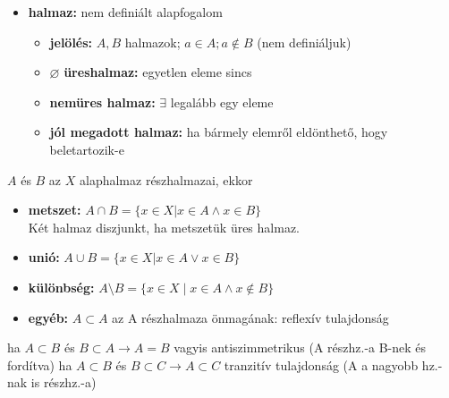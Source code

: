 \documentclass[12pt,a4paper]{article}
\begin{document}
\begin{tcolorbox}[colback=green!5!white,colframe=green!60!black,title= 1. Halmaz{,} metszet{,} unió{,} különbség]
    \begin{itemize}
        \item \textbf{halmaz:} nem definiált alapfogalom
        \begin{itemize}
            \item \textbf{jelölés:} \(A, B\) halmazok; \(a \in  A; a \notin  B\) (nem definiáljuk)
            \item \(\varnothing \) \textbf{üreshalmaz:} egyetlen eleme sincs
            \item \textbf{nemüres halmaz:} \(\exists\)  legalább egy eleme
            \item \textbf{jól megadott halmaz:} ha bármely elemről eldönthető, hogy beletartozik-e
        \end{itemize}
    \end{itemize}
    \(A\) és \(B\) az \(X\) alaphalmaz részhalmazai, ekkor
    \begin{itemize}
        \item \textbf{metszet:} \(A \cap  B = \{ x \in  X | x \in  A \land  x \in  B \}\)\\
        Két halmaz diszjunkt, ha metszetük üres halmaz.
        \item \textbf{unió:} \(A \cup  B = \{ x \in X | x \in A \vee  x \in B \}\)
        \item \textbf{különbség:} \(A \setminus  B = \{ x \in X \mid  x \in A \wedge  x \notin B \}\)
        \item \textbf{egyéb:} \(A \subset  A\) az A részhalmaza önmagának: reflexív tulajdonság
    \end{itemize}
        ha \(A \subset  B\) és \(B \subset  A \rightarrow  A = B\) vagyis antiszimmetrikus (A részhz.-a B-nek és fordítva)
        ha \(A \subset  B\) és \(B \subset  C \rightarrow  A \subset  C\) tranzitív tulajdonság (A a nagyobb hz.-nak is részhz.-a)
\end{tcolorbox}
\end{document}
